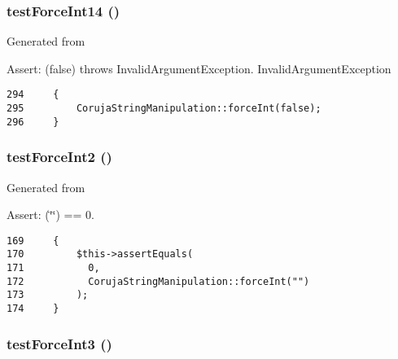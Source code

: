 \hypertarget{class_coruja_string_manipulation_test_015889d37ccc0aeef9b0a4785e05244f}{
\subsubsection[{testForceInt14}]{\setlength{\rightskip}{0pt plus 5cm}testForceInt14 ()}}
\label{class_coruja_string_manipulation_test_015889d37ccc0aeef9b0a4785e05244f}


Generated from \begin{Desc}
\item[Assert:](false) throws InvalidArgumentException.  InvalidArgumentException \end{Desc}


\begin{Code}\begin{verbatim}294     {
295         CorujaStringManipulation::forceInt(false);
296     }
\end{verbatim}
\end{Code}


\hypertarget{class_coruja_string_manipulation_test_52d30a5381c871aaa653d6509ff04e86}{
\subsubsection[{testForceInt2}]{\setlength{\rightskip}{0pt plus 5cm}testForceInt2 ()}}
\label{class_coruja_string_manipulation_test_52d30a5381c871aaa653d6509ff04e86}


Generated from \begin{Desc}
\item[Assert:](\char`\"{}\char`\"{}) == 0. \end{Desc}


\begin{Code}\begin{verbatim}169     {
170         $this->assertEquals(
171           0,
172           CorujaStringManipulation::forceInt("")
173         );
174     }
\end{verbatim}
\end{Code}


\hypertarget{class_coruja_string_manipulation_test_d1694a0a9e26a7d7e67d23646e8a69a8}{
\subsubsection[{testForceInt3}]{\setlength{\rightskip}{0pt plus 5cm}testForceInt3 ()}}
\label{class_coruja_string_manipulation_test_d1694a0a9e26a7d7e67d23646e8a69a8}



